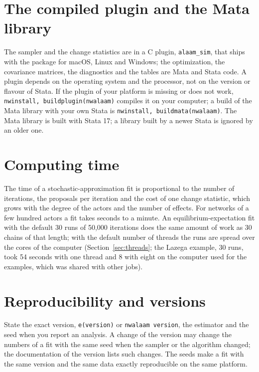 \section{The compiled plugin and the Mata library}

The sampler and the change statistics are in a C plugin, \texttt{alaam\_sim}, that ships with the package for macOS, Linux and Windows; the optimization, the covariance matrices, the diagnostics and the tables are Mata and Stata code. A plugin depends on the operating system and the processor, not on the version or flavour of Stata. If the plugin of your platform is missing or does not work, \texttt{nwinstall, buildplugin(nwalaam)} compiles it on your computer; a build of the Mata library with your own Stata is \texttt{nwinstall, buildmata(nwalaam)}. The Mata library is built with Stata 17; a library built by a newer Stata is ignored by an older one.

\section{Computing time}

The time of a stochastic-approximation fit is proportional to the number of iterations, the proposals per iteration and the cost of one change statistic, which grows with the degree of the actors and the number of effects. For networks of a few hundred actors a fit takes seconds to a minute. An equilibrium-expectation fit with the default 30 runs of 50,000 iterations does the same amount of work as 30 chains of that length; with the default number of threads the runs are spread over the cores of the computer (Section~\ref{sec:threads}; the Lazega example, 30 runs, took 54 seconds with one thread and 8 with eight on the computer used for the examples, which was shared with other jobs).

\section{Reproducibility and versions}

State the exact version, \texttt{e(version)} or \texttt{nwalaam version}, the estimator and the seed when you report an analysis. A change of the version may change the numbers of a fit with the same seed when the sampler or the algorithm changed; the documentation of the version lists such changes. The seeds make a fit with the same version and the same data exactly reproducible on the same platform.
